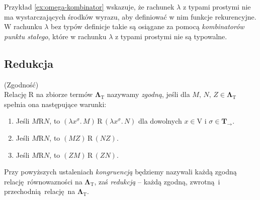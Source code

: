 Przykład \ref{ex:omega-kombinator} wskazuje, że rachunek \(\lambda\) z typami prostymi nie ma wystarczających środków wyrazu, aby definiować w nim funkcje rekurencyjne. W rachunku \(\lambda\) bez typów definicje takie są osiągane za pomocą \emph{kombinatorów punktu stałego}, które w rachunku \(\lambda\) z typami prostymi nie są typowalne. 

\subsection{Redukcja}
\begin{definicja}(Zgodność)\\
  Relację \(\mathrm{R}\) na zbiorze termów \(\mathbf{\Lambda}_{\mathrm{T}}\) nazywamy \emph{zgodną}, jeśli dla \(M,\,N,\,Z\in\mathbf{\Lambda}_{\mathrm{T}}\) spełnia ona następujące warunki:
  \begin{enumerate}[label=\roman*)]
    \item Jeśli \(M\mathrm{R} N\), to \((\lambda x^\sigma.\,M)\, \mathrm{R}\, (\lambda x^\sigma.\, N)\) dla dowolnych \(x\in \mathrm{V}\) i \(\sigma\in \mathbf{T_\to}\).
    \item Jeśli \(M\mathrm{R} N\), to \((MZ)\,\mathrm{R}\, (NZ)\).
    \item Jeśli \(M\mathrm{R} N\), to \((ZM)\,\mathrm{R}\, (ZN)\).
  \end{enumerate}
Przy powyższych ustaleniach \emph{kongruencją} będziemy nazywali każdą zgodną relację równowazności na \(\mathbf{\Lambda}_{\mathrm{T}}\), zaś \emph{redukcją} – każdą zgodną, zwrotną i przechodnią relację na \(\mathbf{\Lambda}_{\mathrm{T}}\).
\end{definicja}

